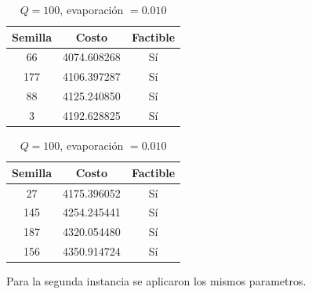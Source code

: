 \documentclass{article}
\begin{document}
    \begin{table}[H]
      \begin{minipage}{0.5\linewidth}
        \centering
        \caption{$Q=10$, evaporación $= 0.010$}
        \begin{tabular}{c c c}
          \hline
          Semilla & Costo & Factible   \\
          \hline
          66      & 4074.608268  & Sí  \\
          177     & 4106.397287  & Sí  \\
          88      & 4125.240850  & Sí  \\
          3       & 4192.628825  & Sí  \\
        \end{tabular}
      \end{minipage}
      \begin{minipage}{0.5\linewidth}
        \centering
        \caption{$Q=100$, evaporación $= 0.010$}
        \begin{tabular}{c c c}
          \hline
          Semilla & Costo & Factible   \\
          \hline
          27      & 4175.396052  & Sí  \\
          145     & 4254.245441  & Sí  \\
          187     & 4320.054480  & Sí  \\
          156     & 4350.914724  & Sí  \\
        \end{tabular}
      \end{minipage}
    \end{table}

    Para la segunda instancia se aplicaron 
    los mismos parametros.
\end{document}
